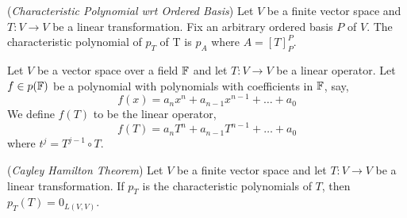 \documentclass{article}
\begin{document}
\begin{ndefi}{(\textit{Characteristic Polynomial wrt Ordered Basis})}
  Let $V$ be a finite vector space and $T: V \to V$ be a linear transformation. Fix an arbitrary ordered basis $P$ of $V$. The characteristic polynomial of $p_T$ of T is $p_A$ where $A = [T]_P^P$.
\end{ndefi}

\begin{ndefi}
  Let $V$ be a vector space over a field $\mathbb{F}$ and let $T: V \to V$ be a linear operator. Let $f \in p(\mathbb{F})$ be a polynomial with polynomials with coefficients in $\mathbb{F}$, say,
  $$ f(x) = a_nx^n + a_{n-1}x^{n-1} + \dots + a_0 $$
  We define $f(T)$ to be the linear operator,
  $$ f(T) = a_nT^n + a_{n-1}T^{n-1} + \dots + a_0 $$
  where $t^j = T^{j-1}\circ T$.
\end{ndefi}

\begin{nthm}{(\textit{Cayley Hamilton Theorem})}
  Let $V$ be a finite vector space and let $T : V \to V$ be a linear transformation. If $p_T$ is the characteristic polynomials of $T$, then $p_T(T) = 0_{L(V, V)}$.
\end{nthm}
\end{document}
